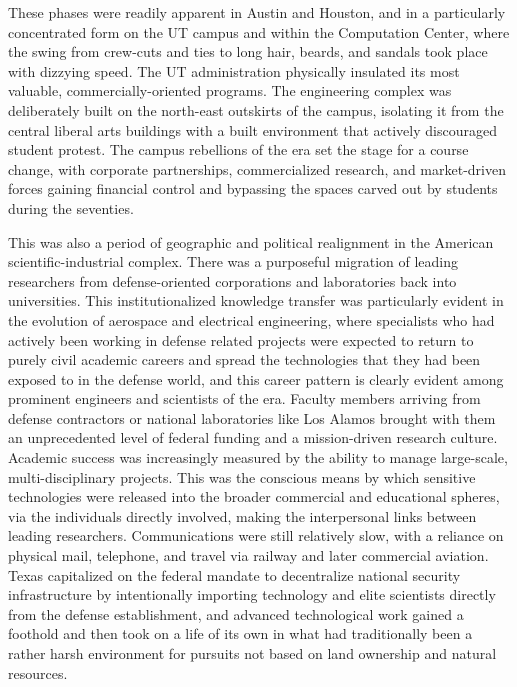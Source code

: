 These phases were readily apparent in Austin and Houston, and in a particularly concentrated form on the UT campus and within the Computation Center, where the swing from crew-cuts and ties to long hair, beards, and sandals took place with dizzying speed. The UT administration physically insulated its most valuable, commercially-oriented programs. The engineering complex was deliberately built on the north-east outskirts of the campus, isolating it from the central liberal arts buildings with a built environment that actively discouraged student protest. The campus rebellions of the era set the stage for a course change, with corporate partnerships, commercialized research, and market-driven forces gaining financial control and bypassing the spaces carved out by students during the seventies. 

This was also a period of geographic and political realignment in the American scientific-industrial complex. There was a purposeful migration of leading researchers from defense-oriented corporations and laboratories back into universities. This institutionalized knowledge transfer was particularly evident in the evolution of aerospace and electrical engineering, where specialists who had actively been working in defense related projects were expected to return to purely civil academic careers and spread the technologies that they had been exposed to in the defense world, and this career pattern is clearly evident among prominent engineers and scientists of the era. Faculty members arriving from defense contractors or national laboratories like Los Alamos brought with them an unprecedented level of federal funding and a mission-driven research culture. Academic success was increasingly measured by the ability to manage large-scale, multi-disciplinary projects. This was the conscious means by which sensitive technologies were released into the broader commercial and educational spheres, via the individuals directly involved, making the interpersonal links between leading researchers. Communications were still relatively slow, with a reliance on physical mail, telephone, and travel via railway and later commercial aviation. Texas capitalized on the federal mandate to decentralize national security infrastructure by intentionally importing technology and elite scientists directly from the defense establishment, and advanced technological work gained a foothold and then took on a life of its own in what had traditionally been a rather harsh environment for pursuits not based on land ownership and natural resources. 

